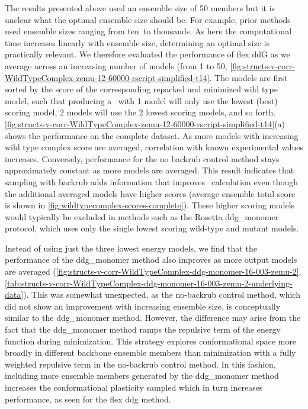 The results presented above used an ensemble size of 50 members but it is unclear what the optimal ensemble size should be. For example, prior methods used ensemble sizes ranging from ten\cite{kamisetty_accounting_2011}\ to thousands\cite{benedix_predicting_2009}. As here the computational time increases linearly with ensemble size, determining an optimal size is practically relevant. We therefore evaluated the performance of flex ddG as we average across an increasing number of models (from 1 to 50, \cref{fig:structs-v-corr-WildTypeComplex-zemu-12-60000-rscript-simplified-t14}.
The models are first sorted by the score of the corresponding repacked and minimized wild type model, such that producing a \ddg\ with 1 model will only use the lowest (best) scoring model, 2 models will use the 2 lowest scoring models, and so forth.
\cref{fig:structs-v-corr-WildTypeComplex-zemu-12-60000-rscript-simplified-t14}(a) shows the performance on the complete dataset.
As more models with increasing wild type complex score are averaged, correlation with known experimental values increases.
Conversely, performance for the no backrub control method stays approximately constant as more models are averaged.
This result indicates that sampling with backrub adds information that improves \ddg\ calculation even though the additional averaged models have higher scores (average ensemble total score is shown in \cref{fig:wildtypecomplex-scores-complete}).
These higher scoring models would typically be excluded in methods such as the Rosetta ddg\_monomer protocol, which uses only the single lowest scoring wild-type and mutant models.

Instead of using just the three lowest energy models\cite{kellogg_role_2011}, we find that the performance of the ddg\_monomer method also improves as more output models are averaged (\cref{fig:structs-v-corr-WildTypeComplex-ddg-monomer-16-003-zemu-2}, \cref{tab:structs-v-corr-WildTypeComplex-ddg-monomer-16-003-zemu-2-underlying-data}).
This was somewhat unexpected, as the no-backrub control method, which did not show an improvement with increasing ensemble size, is conceptually similar to the ddg\_monomer method. However, the difference may arise from the fact that the ddg\_monomer method ramps the repulsive term of the energy function during minimization. This strategy explores conformational space more broadly in different backbone ensemble members than minimization with a fully weighted repulsive term in the no-backrub control method. In this fashion, including more ensemble members generated by the ddg\_monomer method increases the conformational plasticity sampled which in turn increases performance, as seen for the flex ddg method.

